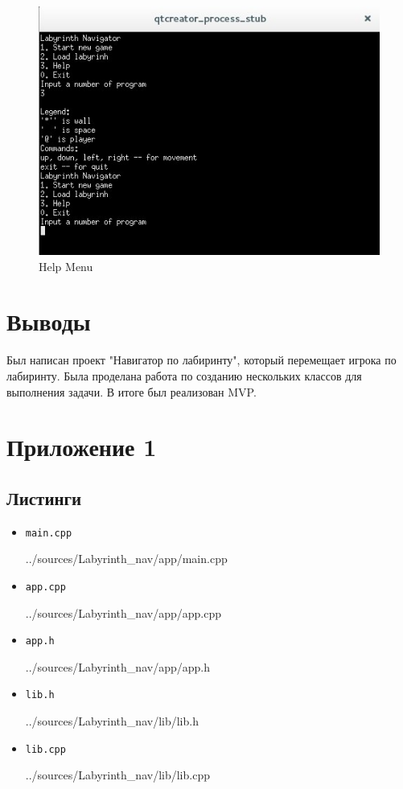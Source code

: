 \documentclass[a4paper]{article}
\begin{document}
\begin{figure}[H]
	\begin{center}
		\includegraphics[scale=0.7]{Screenshot/2.jpg}
		\caption{Help Menu} 
		\label{pic:pic_name} %
	\end{center}
\end{figure}


\section{Выводы}
Был написан проект "Навигатор по лабиринту", который перемещает игрока по лабиринту. Была проделана работа по созданию нескольких классов для выполнения задачи. В итоге был реализован MVP.

\section{Приложение 1}

\subsection*{Листинги}

\begin{itemize}

\item[] \verb-main.cpp-

{../sources/Labyrinth_nav/app/main.cpp}
\item[] \verb-app.cpp-

{../sources/Labyrinth_nav/app/app.cpp}
\item[] \verb-app.h-

{../sources/Labyrinth_nav/app/app.h}

\item[] \verb-lib.h-

{../sources/Labyrinth_nav/lib/lib.h}
\item[] \verb-lib.cpp-

{../sources/Labyrinth_nav/lib/lib.cpp}

\end{itemize}
\end{document}

